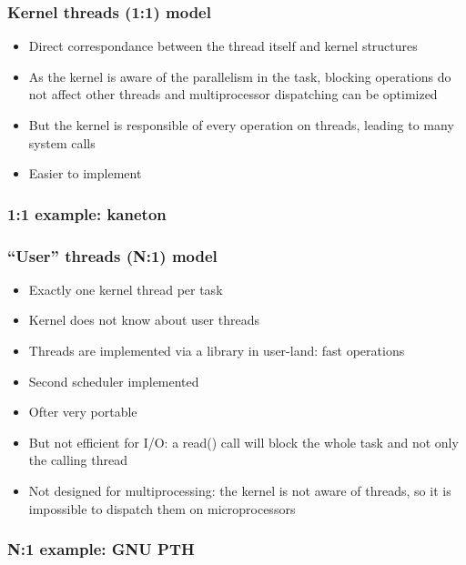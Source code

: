 
\begin{frame}
  \frametitle{Kernel threads (1:1) model}

  \begin{itemize}
  \item
    Direct correspondance between the thread itself and kernel
    structures
  \item
    As the kernel is aware of the parallelism in the task, blocking
    operations do not affect other threads and multiprocessor
    dispatching can be optimized
  \item
    But the kernel is responsible of every operation on threads,
    leading to many system calls
  \item
    Easier to implement
  \end{itemize}

\end{frame}


\begin{frame}
  \frametitle{1:1 example: kaneton}

\end{frame}


\begin{frame}
  \frametitle{``User'' threads (N:1) model}

  \begin{itemize}
  \item
    Exactly one kernel thread per task
  \item
    Kernel does not know about user threads
  \item
    Threads are implemented via a library in user-land: fast
    operations
  \item
    Second scheduler implemented
  \item
    Ofter very portable
  \item
    But not efficient for I/O: a read() call will block the whole task
    and not only the calling thread
  \item
    Not designed for multiprocessing: the kernel is not aware of
    threads, so it is impossible to dispatch them on microprocessors
  \end{itemize}

\end{frame}


\begin{frame}
  \frametitle{N:1 example: GNU PTH}

\end{frame}

